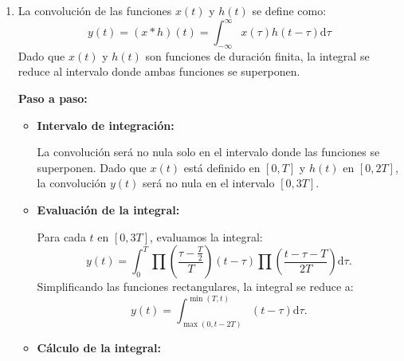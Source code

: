 \begin{enumerate}[label=\color{red}\textbf{\arabic*)}]
  \item {}

    La convolución de las funciones $x(t)$ y $h(t)$ se define como: \[
      y(t)=(x\ast h)(t)=\int_{-\infty}^{\infty} x(\tau) h(t-\tau)\mathrm{d}\tau
    \] 
    Dado que $x(t)$ y  $h(t)$ son funciones de duración finita, la integral se reduce al intervalo donde ambas funciones se superponen.

     \textbf{Paso a paso:}
     \begin{itemize}[label=\textbullet]
       \item \textbf{Intervalo de integración:}

         La convolución será no nula solo en el intervalo donde las funciones se superponen. Dado que $x(t)$ está definido en  $[0,T]$ y  $h(t)$ en  $[0,2T]$, la convolución  $y(t)$ será no nula en el intervalo $[0,3T]$.
       \item  \textbf{Evaluación de la integral:}

         Para cada $t$ en  $[0,3T]$, evaluamos la integral:  \[
           y(t)=\int_{0}^{T} \prod\left( \dfrac{\tau-\frac{T}{2}}{T} \right)  (t-\tau)\prod\left( \dfrac{t-\tau-T}{2T} \right) \mathrm{d}\tau.
         \] 
         Simplificando las funciones rectangulares, la integral se reduce a: \[
         y(t)=\int_{\max(0,t-2T)}^{\min(T,t)}(t-\tau)\mathrm{d}\tau.
         \] 
       \item \textbf{Cálculo de la integral:}


\end{itemize}
\end{enumerate}
